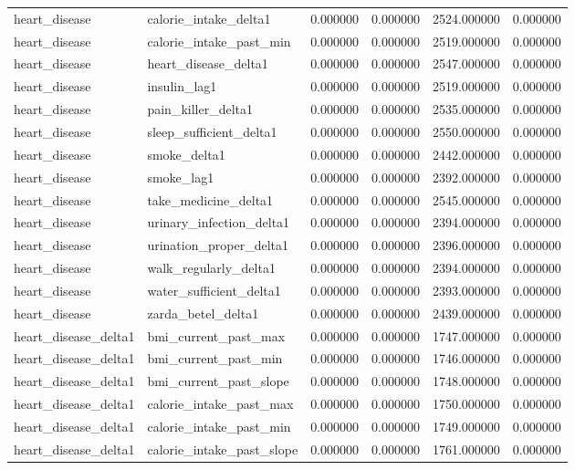 \begin{longtable}{llrrrr}
heart\_disease & calorie\_intake\_delta1 & 0.000000 & 0.000000 & 2524.000000 & 0.000000 \\
heart\_disease & calorie\_intake\_past\_min & 0.000000 & 0.000000 & 2519.000000 & 0.000000 \\
heart\_disease & heart\_disease\_delta1 & 0.000000 & 0.000000 & 2547.000000 & 0.000000 \\
heart\_disease & insulin\_lag1 & 0.000000 & 0.000000 & 2519.000000 & 0.000000 \\
heart\_disease & pain\_killer\_delta1 & 0.000000 & 0.000000 & 2535.000000 & 0.000000 \\
heart\_disease & sleep\_sufficient\_delta1 & 0.000000 & 0.000000 & 2550.000000 & 0.000000 \\
heart\_disease & smoke\_delta1 & 0.000000 & 0.000000 & 2442.000000 & 0.000000 \\
heart\_disease & smoke\_lag1 & 0.000000 & 0.000000 & 2392.000000 & 0.000000 \\
heart\_disease & take\_medicine\_delta1 & 0.000000 & 0.000000 & 2545.000000 & 0.000000 \\
heart\_disease & urinary\_infection\_delta1 & 0.000000 & 0.000000 & 2394.000000 & 0.000000 \\
heart\_disease & urination\_proper\_delta1 & 0.000000 & 0.000000 & 2396.000000 & 0.000000 \\
heart\_disease & walk\_regularly\_delta1 & 0.000000 & 0.000000 & 2394.000000 & 0.000000 \\
heart\_disease & water\_sufficient\_delta1 & 0.000000 & 0.000000 & 2393.000000 & 0.000000 \\
heart\_disease & zarda\_betel\_delta1 & 0.000000 & 0.000000 & 2439.000000 & 0.000000 \\
heart\_disease\_delta1 & bmi\_current\_past\_max & 0.000000 & 0.000000 & 1747.000000 & 0.000000 \\
heart\_disease\_delta1 & bmi\_current\_past\_min & 0.000000 & 0.000000 & 1746.000000 & 0.000000 \\
heart\_disease\_delta1 & bmi\_current\_past\_slope & 0.000000 & 0.000000 & 1748.000000 & 0.000000 \\
heart\_disease\_delta1 & calorie\_intake\_past\_max & 0.000000 & 0.000000 & 1750.000000 & 0.000000 \\
heart\_disease\_delta1 & calorie\_intake\_past\_min & 0.000000 & 0.000000 & 1749.000000 & 0.000000 \\
heart\_disease\_delta1 & calorie\_intake\_past\_slope & 0.000000 & 0.000000 & 1761.000000 & 0.000000 \\

\end{longtable}

